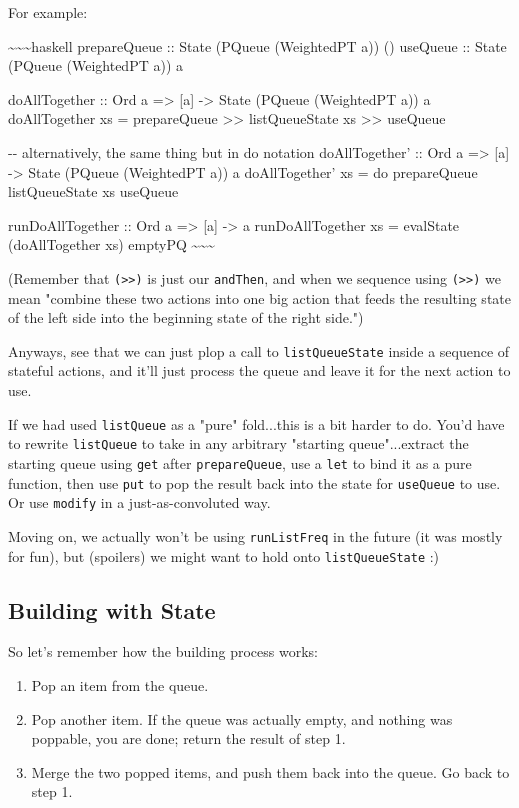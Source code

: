 \documentclass[]{article}
\begin{document}
For example:

\textasciitilde{}\textasciitilde{}\textasciitilde{}haskell prepareQueue :: State
(PQueue (WeightedPT a)) () useQueue :: State (PQueue (WeightedPT a)) a

doAllTogether :: Ord a =\textgreater{} {[}a{]} -\textgreater{} State (PQueue
(WeightedPT a)) a doAllTogether xs = prepareQueue \textgreater{}\textgreater{}
listQueueState xs \textgreater{}\textgreater{} useQueue

-\/- alternatively, the same thing but in do notation doAllTogether' :: Ord a
=\textgreater{} {[}a{]} -\textgreater{} State (PQueue (WeightedPT a)) a
doAllTogether' xs = do prepareQueue listQueueState xs useQueue

runDoAllTogether :: Ord a =\textgreater{} {[}a{]} -\textgreater{} a
runDoAllTogether xs = evalState (doAllTogether xs) emptyPQ
\textasciitilde{}\textasciitilde{}\textasciitilde{}

(Remember that \texttt{(\textgreater{}\textgreater{})} is just our
\texttt{andThen}, and when we sequence using
\texttt{(\textgreater{}\textgreater{})} we mean "combine these two actions into
one big action that feeds the resulting state of the left side into the
beginning state of the right side.")

Anyways, see that we can just plop a call to \texttt{listQueueState} inside a
sequence of stateful actions, and it'll just process the queue and leave it for
the next action to use.

If we had used \texttt{listQueue} as a "pure" fold...this is a bit harder to do.
You'd have to rewrite \texttt{listQueue} to take in any arbitrary "starting
queue"...extract the starting queue using \texttt{get} after
\texttt{prepareQueue}, use a \texttt{let} to bind it as a pure function, then
use \texttt{put} to pop the result back into the state for \texttt{useQueue} to
use. Or use \texttt{modify} in a just-as-convoluted way.

Moving on, we actually won't be using \texttt{runListFreq} in the future (it was
mostly for fun), but (spoilers) we might want to hold onto
\texttt{listQueueState} :)

\subsection{Building with State}

So let's remember how the building process works:

\begin{enumerate}
\tightlist
\item
  Pop an item from the queue.
\item
  Pop another item. If the queue was actually empty, and nothing was poppable,
  you are done; return the result of step 1.
\item
  Merge the two popped items, and push them back into the queue. Go back to step
  1.
\end{enumerate}
\end{document}
